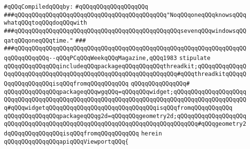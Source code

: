\newline
\verb|#qQQqCompiledqQQqby:|\newline
\verb|#qQQqqQQqqQQqqQQqqQQq|\newline
\newline
\newline
\newline
\newline
\newline
\newline
\verb|###qQQqqQQqqQQqqQQqqQQqqQQqqQQqqQQqqQQqqQQqqQQq"NoqQQqoneqQQqknowsqQQqwhatqQQqtoqQQqdoqQQqwith|\newline
\verb|###qQQqqQQqqQQqqQQqqQQqqQQqqQQqqQQqqQQqqQQqqQQqqQQqsevenqQQqwindowsqQQqatqQQqoneqQQqtime."|\newline
\verb|###|\newline
\verb|###qQQqqQQqqQQqqQQqqQQqqQQqqQQqqQQqqQQqqQQqqQQqqQQqqQQqqQQqqQQqqQQqqQQqqQQqqQQqqQQq--qQQqPCqQQqWeekqQQqMagazine,qQQq1983|\newline
\newline
\newline
\newline
\verb|stipulate|\newline
\verb|qQQqqQQqqQQqqQQqincludeqQQqpackageqQQqqQQqqQQqthreadkit;qQQqqQQqqQQqqQQqqQQqqQQqqQQqqQQqqQQqqQQqqQQqqQQqqQQqqQQqqQQqqQQq#qQQqthreadkitqQQqqQQqqQQqqQQqqQQqisqQQqfromqQQqqQQqqQQq|\newline
\verb|qQQqqQQqqQQqqQQq#|\newline
\verb|qQQqqQQqqQQqqQQqpackageqQQqwgqQQq=qQQqqQQqwidget;qQQqqQQqqQQqqQQqqQQqqQQqqQQqqQQqqQQqqQQqqQQqqQQqqQQqqQQqqQQqqQQqqQQqqQQqqQQqqQQqqQQqqQQqqQQq#qQQqwidgetqQQqqQQqqQQqqQQqqQQqqQQqqQQqqQQqisqQQqfromqQQqqQQqqQQq|\newline
\verb|qQQqqQQqqQQqqQQqpackageqQQqg2d=qQQqqQQqgeometry2d;qQQqqQQqqQQqqQQqqQQqqQQqqQQqqQQqqQQqqQQqqQQqqQQqqQQqqQQqqQQqqQQqqQQqqQQqqQQq#qQQqgeometry2dqQQqqQQqqQQqqQQqisqQQqfromqQQqqQQqqQQq|\newline
\verb|herein|\newline
\newline
\verb|qQQqqQQqqQQqqQQqapiqQQqViewportqQQq{|\newline
